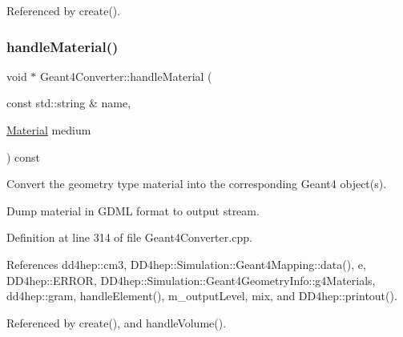 Referenced by create().

\hypertarget{class_d_d4hep_1_1_simulation_1_1_geant4_converter_a20916425ac1291e88a8d4c44bed8ffb7}{}\label{class_d_d4hep_1_1_simulation_1_1_geant4_converter_a20916425ac1291e88a8d4c44bed8ffb7} 
\subsubsection{\texorpdfstring{handle\+Material()}{handleMaterial()}}
{\footnotesize\ttfamily void $\ast$ Geant4\+Converter\+::handle\+Material (\begin{DoxyParamCaption}\item[{const std\+::string \&}]{name,  }\item[{\hyperlink{class_d_d4hep_1_1_simulation_1_1_geant4_mapping_a2539031128388f894af24898eb6189a7}{Material}}]{medium }\end{DoxyParamCaption}) const\hspace{0.3cm}{\ttfamily [virtual]}}



Convert the geometry type material into the corresponding Geant4 object(s). 

Dump material in G\+D\+ML format to output stream. 

Definition at line 314 of file Geant4\+Converter.\+cpp.



References dd4hep\+::cm3, D\+D4hep\+::\+Simulation\+::\+Geant4\+Mapping\+::data(), e, D\+D4hep\+::\+E\+R\+R\+OR, D\+D4hep\+::\+Simulation\+::\+Geant4\+Geometry\+Info\+::g4\+Materials, dd4hep\+::gram, handle\+Element(), m\+\_\+output\+Level, mix, and D\+D4hep\+::printout().



Referenced by create(), and handle\+Volume().

\hypertarget{class_d_d4hep_1_1_simulation_1_1_geant4_converter_a3c7d877926c010d4f888245d6ccbbf19}{}\label{class_d_d4hep_1_1_simulation_1_1_geant4_converter_a3c7d877926c010d4f888245d6ccbbf19} 
